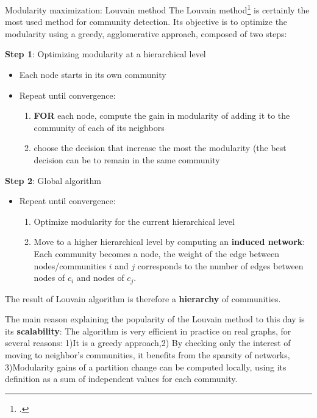 \begin{textbox}{Modularity maximization: Louvain method}
The Louvain method\footcite{blondel2008fast} is certainly the most used method for community detection. Its objective is to optimize the modularity using a greedy, agglomerative approach, composed of two steps: 

\textbf{Step 1}: Optimizing modularity at a hierarchical level
\begin{itemize}
    \item Each node starts in its own community
    \item Repeat until convergence:
    \begin{enumerate}
        \item \textbf{FOR} each node, compute the gain in modularity of adding it to the community of each of its neighbors
        \item choose the decision that increase the most the modularity (the best decision can be to remain in the same community
    \end{enumerate}
\end{itemize}

\textbf{Step 2}: Global algorithm
\begin{itemize}
    \item Repeat until convergence:
    \begin{enumerate}
        \item Optimize modularity for the current hierarchical level
        \item Move to a higher hierarchical level by computing an \textbf{induced network}: Each community becomes a node, the weight of the edge between nodes/communities $i$ and $j$ corresponds to the number of edges between nodes of $c_i$ and nodes of $c_j$.
    \end{enumerate}
\end{itemize}

The result of Louvain algorithm is therefore a \textbf{hierarchy} of communities. 

The main reason explaining the popularity of the Louvain method to this day is its
   \textbf{scalability}: The algorithm is very efficient in practice on real graphs, for several reasons: 1)It is a greedy approach,2) By checking only the interest of moving to neighbor's communities, it benefits from the sparsity of networks, 3)Modularity gains of a partition change can be computed locally, using its definition as a sum of independent values for each community.

\end{textbox}


